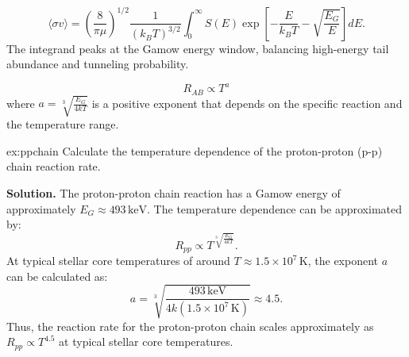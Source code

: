 \begin{theory}
\begin{equation}
    \langle\sigma v\rangle = \left(\frac{8}{\pi\mu}\right)^{1/2}
    \frac{1}{(k_BT)^{3/2}}\int_0^\infty S(E)
    \exp\left[-\frac{E}{k_BT}-\sqrt{\frac{E_G}{E}}\right]dE.
\end{equation}
The integrand peaks at the Gamow energy window, balancing high-energy tail abundance and tunneling probability.
\end{theory}


\begin{theory}
\begin{equation}
    R_{AB} \propto T^{a}
\end{equation}
where $a = \sqrt[3]{\frac{E_G}{4kT}}$ is a positive exponent that depends on the specific reaction and the temperature range.
\end{theory}

\begin{example}{}{ex:ppchain}
Calculate the temperature dependence of the proton-proton (p-p) chain reaction rate.

\smallskip\textbf{Solution.}
The proton-proton chain reaction has a Gamow energy of approximately $E_G \approx 493\,\text{keV}$. The temperature dependence can be approximated by:
\begin{equation}
    R_{pp} \propto T^{\sqrt[3]{\frac{E_G}{4kT}}}.           
\end{equation}
At typical stellar core temperatures of around $T \approx 1.5 \times 10^7\,\text{K}$, the exponent $a$ can be calculated as:
\begin{equation}
    a = \sqrt[3]{\frac{493\,\text{keV}}{4k(1.5 \times 10^7\,\text{K})}} \approx 4.5.    
\end{equation}
Thus, the reaction rate for the proton-proton chain scales approximately as $R_{pp} \propto T^{4.5}$ at typical stellar core temperatures.
\end{example}